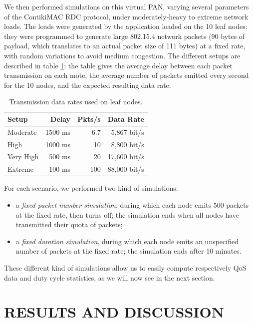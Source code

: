 \documentclass[a4paper,twoside]{article}
\begin{document}
We then performed simulations on this virtual PAN, varying several parameters
of the ContikiMAC RDC protocol, under moderately-heavy to extreme network
loads. The loads were generated by the application loaded on the 10 leaf
nodes: they were programmed to generate large 802.15.4 network packets
(90 bytes of payload, which translates to an actual packet size of
111 bytes) at a fixed rate, with random variations to avoid
medium congestion. The different setups are described in table
\ref{TblDataRates}: the table gives the average delay between
each packet transmission on each mote, the average number of
packets emitted every second for the 10 nodes, and the expected
resulting data rate.

\begin{table}[htb]
\centering
\begin{tabular}{|l|r|r|r|}
\hline
Setup     &  Delay  & Pkts/s & Data Rate \\
\hline
Moderate  & 1500 ms &   6.7  &  5,867 bit/s \\ 
High      & 1000 ms &  10    &  8,800 bit/s \\
Very High &  500 ms &  20    & 17,600 bit/s \\
Extreme   &  100 ms & 100    & 88,000 bit/s \\
\hline
\end{tabular}
\caption{Transmission data rates used on leaf nodes.}
\label{TblDataRates}
\end{table}

For each scenario, we performed two kind of simulations:
\begin{itemize}
\item a \emph{fixed packet number simulation}, during which each node emits
500 packets at the fixed rate, then turns off; the simulation ends when all
nodes have transmitted their quota of packets;

\item a \emph{fixed duration simulation}, during which each node emits an
unspecified number of packets at the fixed rate; the simulation ends after
10 minutes.
\end{itemize}

These different kind of simulations allow us to easily compute respectively
QoS data and duty cycle statistics, as we will now see in the next section.



\section{\uppercase{Results and Discussion}}
\end{document}
